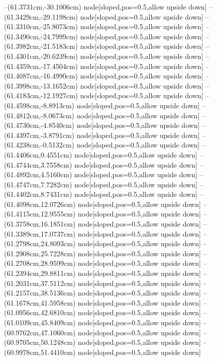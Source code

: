 --(61.3731cm,-30.1006cm) node[sloped,pos=0.5,allow upside down]{\ArrowIn}
--(61.3429cm,-29.1198cm) node[sloped,pos=0.5,allow upside down]{\arrowIn}
--(61.3310cm,-25.8073cm) node[sloped,pos=0.5,allow upside down]{\ArrowIn}
--(61.3490cm,-24.7999cm) node[sloped,pos=0.5,allow upside down]{\ArrowIn}
--(61.3982cm,-21.5183cm) node[sloped,pos=0.5,allow upside down]{\ArrowIn}
--(61.4301cm,-20.6239cm) node[sloped,pos=0.5,allow upside down]{\arrowIn}
--(61.4359cm,-17.4504cm) node[sloped,pos=0.5,allow upside down]{\ArrowIn}
--(61.4087cm,-16.4990cm) node[sloped,pos=0.5,allow upside down]{\arrowIn}
--(61.3998cm,-13.1652cm) node[sloped,pos=0.5,allow upside down]{\ArrowIn}
--(61.4183cm,-12.1927cm) node[sloped,pos=0.5,allow upside down]{\arrowIn}
--(61.4598cm,-8.8913cm) node[sloped,pos=0.5,allow upside down]{\ArrowIn}
--(61.4812cm,-8.0673cm) node[sloped,pos=0.5,allow upside down]{\arrowIn}
--(61.4730cm,-4.8540cm) node[sloped,pos=0.5,allow upside down]{\ArrowIn}
--(61.4397cm,-3.8791cm) node[sloped,pos=0.5,allow upside down]{\arrowIn}
--(61.4238cm,-0.5132cm) node[sloped,pos=0.5,allow upside down]{\ArrowIn}
--(61.4406cm,0.4551cm) node[sloped,pos=0.5,allow upside down]{\arrowIn}
--(61.4744cm,3.7558cm) node[sloped,pos=0.5,allow upside down]{\ArrowIn}
--(61.4892cm,4.5160cm) node[sloped,pos=0.5,allow upside down]{\arrowIn}
--(61.4747cm,7.7282cm) node[sloped,pos=0.5,allow upside down]{\ArrowIn}
--(61.4402cm,8.7431cm) node[sloped,pos=0.5,allow upside down]{\ArrowIn}
--(61.4098cm,12.0726cm) node[sloped,pos=0.5,allow upside down]{\ArrowIn}
--(61.4115cm,12.9555cm) node[sloped,pos=0.5,allow upside down]{\arrowIn}
--(61.3758cm,16.1851cm) node[sloped,pos=0.5,allow upside down]{\ArrowIn}
--(61.3389cm,17.0737cm) node[sloped,pos=0.5,allow upside down]{\arrowIn}
--(61.2798cm,24.8093cm) node[sloped,pos=0.5,allow upside down]{\ArrowIn}
--(61.2908cm,25.7228cm) node[sloped,pos=0.5,allow upside down]{\arrowIn}
--(61.2708cm,28.9599cm) node[sloped,pos=0.5,allow upside down]{\ArrowIn}
--(61.2394cm,29.8811cm) node[sloped,pos=0.5,allow upside down]{\arrowIn}
--(61.2031cm,37.5112cm) node[sloped,pos=0.5,allow upside down]{\ArrowIn}
--(61.2157cm,38.5136cm) node[sloped,pos=0.5,allow upside down]{\ArrowIn}
--(61.1678cm,41.5958cm) node[sloped,pos=0.5,allow upside down]{\ArrowIn}
--(61.0956cm,42.6810cm) node[sloped,pos=0.5,allow upside down]{\ArrowIn}
--(61.0109cm,45.8409cm) node[sloped,pos=0.5,allow upside down]{\ArrowIn}
--(60.9762cm,47.1060cm) node[sloped,pos=0.5,allow upside down]{\ArrowIn}
--(60.9705cm,50.1248cm) node[sloped,pos=0.5,allow upside down]{\ArrowIn}
--(60.9978cm,51.4410cm) node[sloped,pos=0.5,allow upside down]{\ArrowIn}
